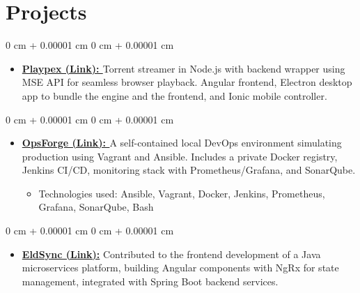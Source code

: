 \documentclass[10pt, letterpaper]{article}
\newenvironment{highlights}{
  \begin{itemize}[
    topsep=0.10 cm,
    parsep=0.10 cm,
    partopsep=0pt,
    itemsep=0pt,
    leftmargin=0 cm + 10pt
    ]
  }{
\end{itemize}
}
\newenvironment{highlightsforbulletentries}{
  \begin{itemize}[
    topsep=0 cm,
    parsep=0.10 cm,
    partopsep=0pt,
    itemsep=0pt,
    leftmargin=10pt
    ]
  }{
\end{itemize}
} %
\newenvironment{onecolentry}{
  \begin{adjustwidth}{
      0 cm + 0.00001 cm
    }{
      0 cm + 0.00001 cm
    }
  }{
  \end{adjustwidth}
} %
\begin{document}



\section{Projects}

\begin{onecolentry}
  \begin{highlights}
  \item \textbf{\href{https://ihebbelhadj.vercel.app/projects/torrent-streamer}{Playpex (Link): }}  Torrent streamer in Node.js with backend wrapper using MSE API for seamless browser playback. Angular frontend, Electron desktop app to bundle the engine and the frontend, and Ionic mobile controller.
  \end{highlights}
\end{onecolentry}

\vspace{0.1 cm}
\begin{onecolentry}
  \begin{highlights}
  \item \textbf{\href{https://ihebbelhadj.vercel.app/projects/devops_playground}{OpsForge (Link): }}  A self-contained local DevOps environment simulating production using Vagrant and Ansible. Includes a private Docker registry, Jenkins CI/CD, monitoring stack with Prometheus/Grafana, and SonarQube.
    \begin{highlightsforbulletentries}
    \item Technologies used: Ansible, Vagrant, Docker, Jenkins, Prometheus, Grafana, SonarQube, Bash
    \end{highlightsforbulletentries}
  \end{highlights}
\end{onecolentry}


\vspace{0.1 cm}
\begin{onecolentry}
  \begin{highlights}
  \item \textbf{\href{https://ihebbelhadj.vercel.app/projects/elder_care_saas}{EldSync (Link):}} Contributed to the frontend development of a Java microservices platform, building Angular components with NgRx for state management, integrated with Spring Boot backend services.
  \end{highlights}
\end{onecolentry}
\end{document}
